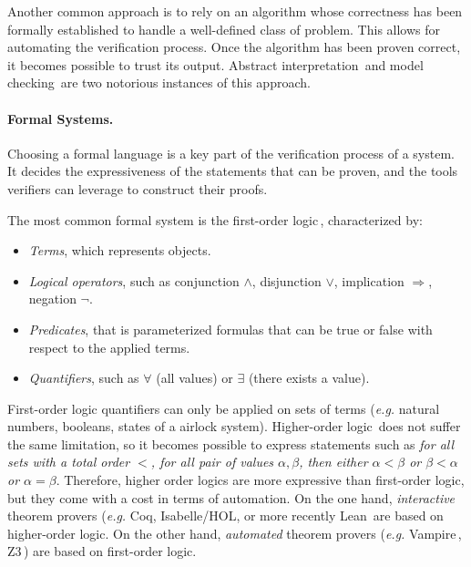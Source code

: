Another common approach is to rely on an algorithm whose correctness has been
formally established to handle a well-defined class of problem.
%
This allows for automating the verification process.
%
Once the algorithm has been proven correct, it becomes possible to trust its
output.
%
Abstract interpretation\,\cite{cousot1977absint} and model
checking\,\cite{clarke2018modelc} are two notorious instances of this approach.

\paragraph{Formal Systems.}
%
Choosing a formal language is a key part of the verification process of a
system.
%
It decides the expressiveness of the statements that can be proven, and the
tools verifiers can leverage to construct their proofs.

The most common formal system is the first-order logic\,\cite{smullyan2012fol},
characterized by:
%
\begin{itemize}
\item \emph{Terms}, which represents objects.
\item \emph{Logical operators}, such as conjunction \( \wedge \), disjunction
  \( \vee \), implication \( \Rightarrow \), negation \( \neg \).
\item \emph{Predicates}, that is parameterized formulas that can be true or
  false with respect to the applied terms.
\item \emph{Quantifiers}, such as \( \forall \) (all values) or \( \exists \)
  (there exists a value).
\end{itemize}

First-order logic quantifiers can only be applied on sets of terms (\emph{e.g.}
natural numbers, booleans, states of a airlock system).
%
Higher-order logic\,\cite{leivant1994hol} does not suffer the same limitation,
so it becomes possible to express statements such as \emph{for all sets with a
  total order \( < \), for all pair of values \( \alpha, \beta \), then either
  \( \alpha < \beta \) or \( \beta < \alpha \) or \( \alpha = \beta \)}.
%
Therefore, higher order logics are more expressive than first-order logic, but
they come with a cost in terms of automation.
%
On the one hand, \emph{interactive} theorem provers (\emph{e.g.}  Coq,
Isabelle/HOL, or more recently Lean\,\cite{de2015lean} are based on higher-order
logic.
%
On the other hand, \emph{automated} theorem provers (\emph{e.g.}
Vampire\,\cite{riazanov2002vampire}, Z3\,\cite{de2008z3}) are based on
first-order logic.

